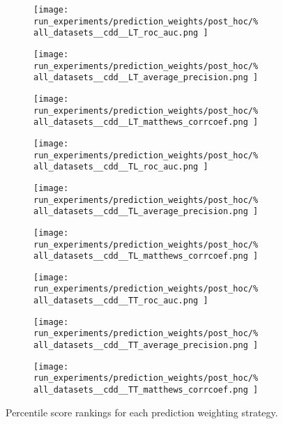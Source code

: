 \begin{figure*}
    \centering
    \begin{subfigure}{0.32\textwidth}
        \texttt{[image: 
            run\_experiments/prediction\_weights/post\_hoc/\%
            all\_datasets\_\_cdd\_\_LT\_roc\_auc.png
        ]}
    \end{subfigure}
    \begin{subfigure}{0.32\textwidth}
        \texttt{[image: 
            run\_experiments/prediction\_weights/post\_hoc/\%
            all\_datasets\_\_cdd\_\_LT\_average\_precision.png
        ]}
    \end{subfigure}
    \begin{subfigure}{0.32\textwidth}
        \texttt{[image: 
            run\_experiments/prediction\_weights/post\_hoc/\%
            all\_datasets\_\_cdd\_\_LT\_matthews\_corrcoef.png
        ]}
    \end{subfigure}

    \begin{subfigure}{0.32\textwidth}
        \texttt{[image: 
            run\_experiments/prediction\_weights/post\_hoc/\%
            all\_datasets\_\_cdd\_\_TL\_roc\_auc.png
        ]}
    \end{subfigure}
    \begin{subfigure}{0.32\textwidth}
        \texttt{[image: 
            run\_experiments/prediction\_weights/post\_hoc/\%
            all\_datasets\_\_cdd\_\_TL\_average\_precision.png
        ]}
    \end{subfigure}
    \begin{subfigure}{0.32\textwidth}
        \texttt{[image: 
            run\_experiments/prediction\_weights/post\_hoc/\%
            all\_datasets\_\_cdd\_\_TL\_matthews\_corrcoef.png
        ]}
    \end{subfigure}

    \begin{subfigure}{0.32\textwidth}
        \texttt{[image: 
            run\_experiments/prediction\_weights/post\_hoc/\%
            all\_datasets\_\_cdd\_\_TT\_roc\_auc.png
        ]}
    \end{subfigure}
    \begin{subfigure}{0.32\textwidth}
        \texttt{[image: 
            run\_experiments/prediction\_weights/post\_hoc/\%
            all\_datasets\_\_cdd\_\_TT\_average\_precision.png
        ]}
    \end{subfigure}
    \begin{subfigure}{0.32\textwidth}
        \texttt{[image: 
            run\_experiments/prediction\_weights/post\_hoc/\%
            all\_datasets\_\_cdd\_\_TT\_matthews\_corrcoef.png
        ]}
    \end{subfigure}
    \caption{Percentile score rankings for each prediction weighting strategy.}
    \label{fig:pred_weights}
\end{figure*}

